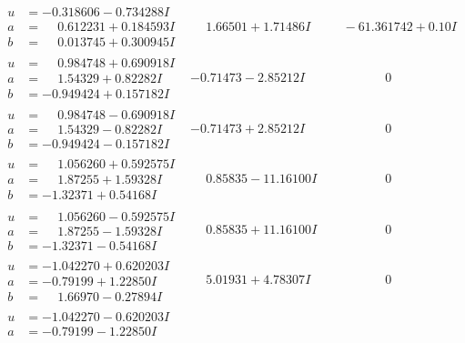 \documentclass[1p]{elsarticle_modified}
\theoremstyle{definition}
\begin{document}
$$\begin{array}{c|c|c}
 \hline 
\begin{aligned}
u &= -0.318606 - 0.734288 I \\
a &= \phantom{-}0.612231 + 0.184593 I \\
b &= \phantom{-}0.013745 + 0.300945 I\end{aligned}
 & \phantom{-}1.66501 + 1.71486 I & \phantom{-}                -6
1.361742 + 0. 10   I\phantom{ +0.000000I} \\ \hline\begin{aligned}
u &= \phantom{-}0.984748 + 0.690918 I \\
a &= \phantom{-}1.54329 + 0.82282 I \\
b &= -0.949424 + 0.157182 I\end{aligned}
 & -0.71473 - 2.85212 I & \phantom{-0.000000 } 0 \\ \hline\begin{aligned}
u &= \phantom{-}0.984748 - 0.690918 I \\
a &= \phantom{-}1.54329 - 0.82282 I \\
b &= -0.949424 - 0.157182 I\end{aligned}
 & -0.71473 + 2.85212 I & \phantom{-0.000000 } 0 \\ \hline\begin{aligned}
u &= \phantom{-}1.056260 + 0.592575 I \\
a &= \phantom{-}1.87255 + 1.59328 I \\
b &= -1.32371 + 0.54168 I\end{aligned}
 & \phantom{-}0.85835 - 11.16100 I & \phantom{-0.000000 } 0 \\ \hline\begin{aligned}
u &= \phantom{-}1.056260 - 0.592575 I \\
a &= \phantom{-}1.87255 - 1.59328 I \\
b &= -1.32371 - 0.54168 I\end{aligned}
 & \phantom{-}0.85835 + 11.16100 I & \phantom{-0.000000 } 0 \\ \hline\begin{aligned}
u &= -1.042270 + 0.620203 I \\
a &= -0.79199 + 1.22850 I \\
b &= \phantom{-}1.66970 - 0.27894 I\end{aligned}
 & \phantom{-}5.01931 + 4.78307 I & \phantom{-0.000000 } 0 \\ \hline\begin{aligned}
u &= -1.042270 - 0.620203 I \\
a &= -0.79199 - 1.22850 I \\

\end{aligned}
\end{array}$$
\end{document}
